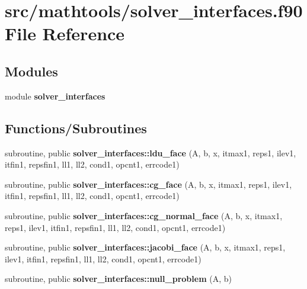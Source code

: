 \section{src/mathtools/solver\+\_\+interfaces.f90 File Reference}
\label{solver__interfaces_8f90}
\subsection*{Modules}
\begin{DoxyCompactItemize}
\item 
module {\bf solver\+\_\+interfaces}
\end{DoxyCompactItemize}
\subsection*{Functions/\+Subroutines}
\begin{DoxyCompactItemize}
\item 
subroutine, public {\bf solver\+\_\+interfaces\+::ldu\+\_\+face} (A, b, x, itmax1, reps1, ilev1, itfin1, repsfin1, ll1, ll2, cond1, opcnt1, errcode1)
\item 
subroutine, public {\bf solver\+\_\+interfaces\+::cg\+\_\+face} (A, b, x, itmax1, reps1, ilev1, itfin1, repsfin1, ll1, ll2, cond1, opcnt1, errcode1)
\item 
subroutine, public {\bf solver\+\_\+interfaces\+::cg\+\_\+normal\+\_\+face} (A, b, x, itmax1, reps1, ilev1, itfin1, repsfin1, ll1, ll2, cond1, opcnt1, errcode1)
\item 
subroutine, public {\bf solver\+\_\+interfaces\+::jacobi\+\_\+face} (A, b, x, itmax1, reps1, ilev1, itfin1, repsfin1, ll1, ll2, cond1, opcnt1, errcode1)
\item 
subroutine, public {\bf solver\+\_\+interfaces\+::null\+\_\+problem} (A, b)
\end{DoxyCompactItemize}
